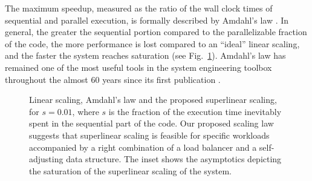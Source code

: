 The maximum speedup, measured as the ratio of the wall clock times of sequential and parallel execution, is formally described by Amdahl's law \cite{10.1145/1465482.1465560}. In general, the greater the sequential portion compared to the parallelizable fraction of the code, the more performance is lost compared to an ``ideal'' linear scaling, and the faster the system reaches saturation (see Fig.~\ref{fig:amdahl}). Amdahl's law has remained one of the most useful tools in the system engineering toolbox throughout the almost 60 years since its first publication \cite{10.5555/1951599, 10.1145/42411.42415, 4563876, 6280307,1580395,406581,6163449, 10.5555/775339.775386}.

\begin{figure}[t]
  \centering
  \begin{small}
  
\end{small}
  \caption{Linear scaling, Amdahl's law and the proposed superlinear scaling, for $s=0.01$, where $s$ is the fraction of the execution time inevitably spent in the sequential part of the code. Our proposed scaling law suggests that superlinear scaling is feasible for specific workloads accompanied by a right combination of a load balancer and a self-adjusting data structure.
    The inset shows the asymptotics depicting the saturation of the superlinear scaling of the system.
    }
  \label{fig:amdahl}
\end{figure}

